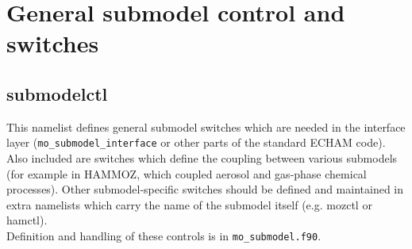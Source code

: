 \documentclass[landscape, 11pt]{article}
\begin{document}
\section{General submodel control and switches}
\subsection{submodelctl} 
This namelist defines general submodel switches which are needed in the interface layer (\texttt{mo\_submodel\_interface} or other parts of the standard ECHAM code). Also included are switches which define the coupling between various submodels (for example in HAMMOZ, which coupled aerosol and gas-phase chemical processes). Other submodel-specific switches should be defined and maintained in extra namelists which carry the name of the submodel itself (e.g. mozctl or hamctl).\\

Definition and handling of these controls is in \texttt{mo\_submodel.f90}.\\
\end{document}
